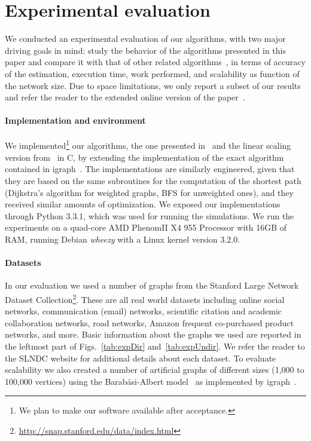 \section{Experimental evaluation}\label{sec:exper}
We conducted an experimental evaluation of our algorithms, with two major
driving goals in mind: study the behavior of the algorithms presented in this
paper and compare it with that of other related
algorithms~\citep{Brandes01,BrandesP07,JacobKLPT05,GeisbergerSS08}, in terms of
accuracy of the estimation, execution time, work performed, and scalability as
function of the network size. Due to space limitations, we only report a subset
of our results and refer the reader to the extended online version of the
paper~\citep{RiondatoK13}.

\paragraph{Implementation and environment}
We implemented\footnote{We plan to make our software available after
acceptance.} our algorithms, the one presented in~\citep{BrandesP07,JacobKLPT05}
and the linear scaling version from~\citep{GeisbergerSS08} in C, by extending
the implementation of the exact algorithm~\citep{Brandes01} contained in
igraph~\citep{igraph}. The implementations are similarly engineered, given that
they are based on the same subroutines for the computation of the shortest path
(Dijkstra's algorithm for weighted graphs, BFS for unweighted ones), and they
received similar amounts of optimization. We exposed our implementations through
Python 3.3.1, which was used for running the simulations. We run the experiments
on a quad-core AMD Phenom\texttrademark II X4 955 Processor with 16GB of RAM,
running Debian \emph{wheezy} with a Linux kernel version 3.2.0.

\paragraph{Datasets} In our evaluation we used a number of graphs from the
Stanford Large Network Dataset
Collection\footnote{\url{http://snap.stanford.edu/data/index.html}}. These are
all real world datasets including online social networks, communication (email)
networks, scientific citation and academic collaboration networks, road
networks, Amazon frequent co-purchased product networks, and more. Basic
information about the graphs we used are reported in the leftmost part
of Figs.~\ref{tab:expDir} and~\ref{tab:expUndir}. We refer the
reader to the SLNDC website for additional details about each dataset. 
To evaluate scalability we also created a number of artificial graphs of
different sizes (1,000 to 100,000 vertices) using the Barab\'asi-Albert
model~\citep{BarabasiA99} as implemented by igraph~\citep{igraph}. 

